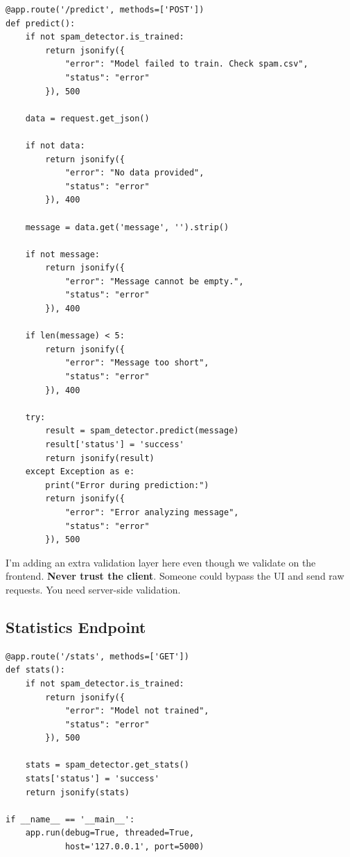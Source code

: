 \documentclass[12pt, a4paper]{article}
\begin{document}
\begin{verbatim}
@app.route('/predict', methods=['POST'])
def predict():
    if not spam_detector.is_trained:
        return jsonify({
            "error": "Model failed to train. Check spam.csv",
            "status": "error"
        }), 500
    
    data = request.get_json()
    
    if not data:
        return jsonify({
            "error": "No data provided",
            "status": "error"
        }), 400
    
    message = data.get('message', '').strip()
    
    if not message:
        return jsonify({
            "error": "Message cannot be empty.",
            "status": "error"
        }), 400
    
    if len(message) < 5:
        return jsonify({
            "error": "Message too short",
            "status": "error"
        }), 400
    
    try:
        result = spam_detector.predict(message)
        result['status'] = 'success'
        return jsonify(result)
    except Exception as e:
        print("Error during prediction:")
        return jsonify({
            "error": "Error analyzing message",
            "status": "error"
        }), 500
\end{verbatim}

\begin{techdetail}
    I'm adding an extra validation layer here even though we validate on the frontend. \textbf{Never trust the client}. Someone could bypass the UI and send raw requests. You need server-side validation.
\end{techdetail}

\subsection{Statistics Endpoint}

\begin{verbatim}
@app.route('/stats', methods=['GET'])
def stats():
    if not spam_detector.is_trained:
        return jsonify({
            "error": "Model not trained",
            "status": "error"
        }), 500
    
    stats = spam_detector.get_stats()
    stats['status'] = 'success'
    return jsonify(stats)

if __name__ == '__main__':
    app.run(debug=True, threaded=True, 
            host='127.0.0.1', port=5000)
\end{verbatim}
\end{document}
